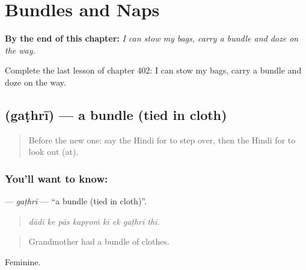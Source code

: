
\chapter{Bundles and Naps}
\label{ch:hi-bundles-and-naps}

\begin{chapteropening}
\textbf{By the end of this chapter:} \emph{I can stow my bags, carry a bundle and doze on the way.}

Complete the last lesson of chapter 402: I can stow my bags, carry a bundle and doze on the way.
\end{chapteropening}

\section[\texorpdfstring{\hi{गठरी} (gaṭhrī)}{गठरी (gaṭhrī)}]{ (gaṭhrī) — a bundle (tied in cloth)}

\label{lesson:HI-C402-gathri}



\begin{quote}
Before the new one: say the Hindi for to step over, then the Hindi for to look out (at).
\end{quote}

\subsection*{You'll want to know: }
\textbf{} — \emph{gaṭhrī} — \textquotedblleft{}a bundle (tied in cloth)\textquotedblright{}.

\begin{quote}
       
\end{quote}

\begin{quote}
\emph{dādī ke pās kapṛoṁ kī ek gaṭhrī thī.}
\end{quote}

\begin{quote}
Grandmother had a bundle of clothes.
\end{quote}

Feminine.

